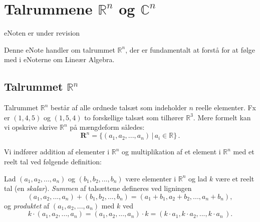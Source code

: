 
\setcounter{chapter}{0} %

\chapter{Talrummene $\mathbb R^n $ og $\mathbb C^n $} \label{tn1}

eNoten er under revision

 

\begin{basis}
Denne eNote handler om talrummet $\mathbb R^n $, der er fundamentalt at forstå for at følge med i eNoterne om Lineær Algebra.
\end{basis}

\section{Talrummet $\mathbb R^n $}

Talrummet $\mathbb R ^n$ består af alle ordnede talsæt som indeholder $n$ reelle elementer. Fx er $(1,4,5)$ og $(1,5,4)$ to forskellige talsæt som tilhører $\mathbb R ^3$. Mere formelt kan vi opskrive skrive $\mathbb R ^n$ på mængdeform således:
\begin{equation}\label{eqRn}
\mathbf R ^n=\{(a_1,a_2,...,a_n)\,|\,a_i \in \mathbb R\}\,.
\end{equation}

Vi indfører addition af elementer i $\mathbb R ^n$ og multiplikation af et element i $\mathbb R ^n$ med et reelt tal ved følgende definition:

\begin{definition}\label{tn1.defRegneOP}
Lad $(a_1,a_2,...,a_n)$ og $(b_1,b_2,...,b_n)$ være elementer i $\mathbb R ^n$ og lad $k$ være et reelt tal (en \emph{skalar}).
\textit{Summen} af talsættene defineres ved ligningen
\begin{equation}\label{eqRnSum}
(a_1,a_2,...,a_n)+(b_1,b_2,...,b_n)=(a_1+b_1,a_2+b_2,...,a_n+b_n),
\end{equation}
og \textit{produktet} af $(a_1,a_2,...,a_n)$ med $k$ ved
\begin{equation}\label{eqRnMult}
k\cdot(a_1,a_2,...,a_n)=(a_1,a_2,...,a_n)\cdot k=(k\cdot a_1,k\cdot a_2,...,k\cdot a_n\,).
\end{equation}
\end{definition}

